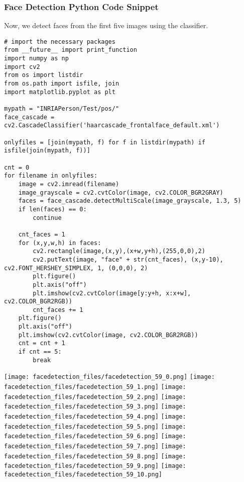 \subsubsection{Face Detection Python Code
Snippet}\label{face-detection-python-code-snippet}

Now, we detect faces from the first five images using the classifier.

\begin{lstlisting}
# import the necessary packages
from __future__ import print_function
import numpy as np
import cv2
from os import listdir
from os.path import isfile, join
import matplotlib.pyplot as plt

mypath = "INRIAPerson/Test/pos/"
face_cascade = cv2.CascadeClassifier('haarcascade_frontalface_default.xml')

onlyfiles = [join(mypath, f) for f in listdir(mypath) if isfile(join(mypath, f))]

cnt = 0
for filename in onlyfiles:
    image = cv2.imread(filename)
    image_grayscale = cv2.cvtColor(image, cv2.COLOR_BGR2GRAY)
    faces = face_cascade.detectMultiScale(image_grayscale, 1.3, 5)
    if len(faces) == 0:
        continue

    cnt_faces = 1
    for (x,y,w,h) in faces:
        cv2.rectangle(image,(x,y),(x+w,y+h),(255,0,0),2)
        cv2.putText(image, "face" + str(cnt_faces), (x,y-10), cv2.FONT_HERSHEY_SIMPLEX, 1, (0,0,0), 2)
        plt.figure()
        plt.axis("off")
        plt.imshow(cv2.cvtColor(image[y:y+h, x:x+w], cv2.COLOR_BGR2RGB))
        cnt_faces += 1
    plt.figure()
    plt.axis("off")
    plt.imshow(cv2.cvtColor(image, cv2.COLOR_BGR2RGB))        
    cnt = cnt + 1
    if cnt == 5:
        break
\end{lstlisting}

\texttt{[image: facedetection\_files/facedetection\_59\_0.png]}
\texttt{[image: facedetection\_files/facedetection\_59\_1.png]}
\texttt{[image: facedetection\_files/facedetection\_59\_2.png]}
\texttt{[image: facedetection\_files/facedetection\_59\_3.png]}
\texttt{[image: facedetection\_files/facedetection\_59\_4.png]}
\texttt{[image: facedetection\_files/facedetection\_59\_5.png]}
\texttt{[image: facedetection\_files/facedetection\_59\_6.png]}
\texttt{[image: facedetection\_files/facedetection\_59\_7.png]}
\texttt{[image: facedetection\_files/facedetection\_59\_8.png]}
\texttt{[image: facedetection\_files/facedetection\_59\_9.png]}
\texttt{[image: facedetection\_files/facedetection\_59\_10.png]}

